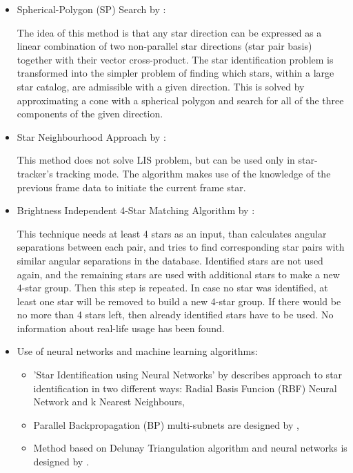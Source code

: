 \documentclass[12pt,a4paper,twoside]{article}
\begin{document}
\begin{itemize}
\item Spherical-Polygon (SP) Search by \citet{mortari1999sp}:

The idea of this method is that any star direction can be expressed as a linear combination of two non-parallel star directions (star pair basis) together with their vector cross-product. The star identification problem is transformed into the simpler problem of finding which stars, within a large star catalog, are admissible with a given direction. This is solved by approximating a cone with a spherical polygon and search for all of the three components of the given direction. 

\item Star Neighbourhood Approach by \citet{samaan2005recursive}:

This method does not solve LIS problem, but can be used only in star-tracker's tracking mode. The algorithm makes use of the knowledge of the previous frame data to initiate the current frame star.


\item Brightness Independent 4-Star Matching Algorithm by \citet{dong2006brightness}:

This technique needs at least 4 stars as an input, than calculates angular separations between each pair, and tries to find corresponding star pairs with similar angular separations in the database.
Identified stars are not used again, and the remaining stars are used with additional stars to make a new 4-star group. Then this step is repeated. In case no star was identified, at least one star will be removed to build a new 4-star group. If there would be no more than 4 stars left, then already identified stars have to be used.
No information about real-life usage has been found.

\item Use of neural networks and machine learning algorithms:

\begin{itemize}
\item 'Star Identification using Neural Networks' by \citet{lindbladstar} describes approach to star identification in two different ways: Radial Basis Funcion (RBF) Neural Network and k Nearest Neighbours,

\item Parallel Backpropagation (BP) multi-subnets are designed by \citet{li2003star},

\item Method based on Delunay Triangulation algorithm and neural networks is designed by \citet{miri2012star}.

\end{itemize}
\end{itemize}
\end{document}

